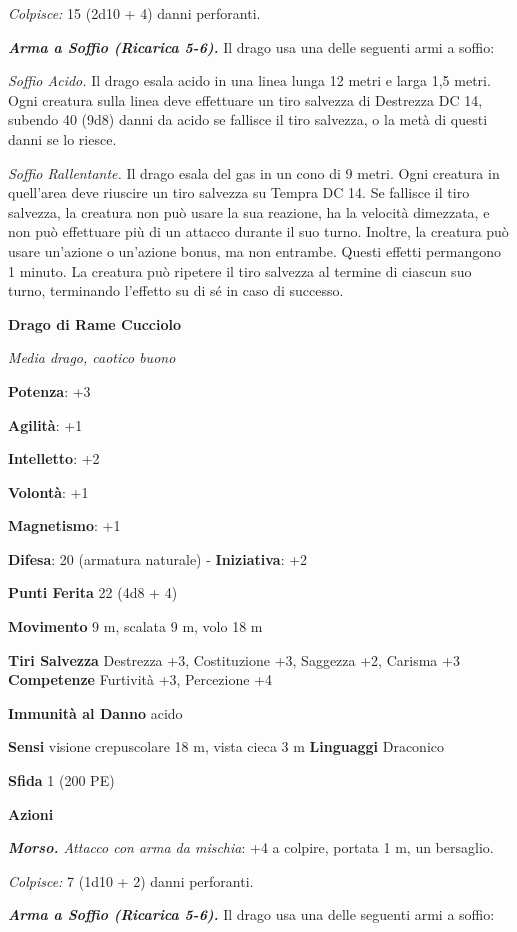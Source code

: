 \begin{multicols}{2}
\emph{Colpisce:} 15 (2d10 + 4) danni perforanti.

\emph{\textbf{Arma a Soffio (Ricarica 5-6).}} Il drago usa una delle
seguenti armi a soffio:

\emph{Soffio Acido.} Il drago esala acido in una linea lunga 12 metri e
larga 1,5 metri. Ogni creatura sulla linea deve effettuare un tiro
salvezza di Destrezza DC 14, subendo 40 (9d8) danni da acido se fallisce
il tiro salvezza, o la metà di questi danni se lo riesce.

\emph{Soffio Rallentante.} Il drago esala del gas in un cono di 9 metri.
Ogni creatura in quell'area deve riuscire un tiro salvezza su Tempra DC 14. Se fallisce il tiro salvezza, la creatura non può
usare la sua reazione, ha la velocità dimezzata, e non può effettuare
più di un attacco durante il suo turno. Inoltre, la creatura può usare
un'azione o un'azione bonus, ma non entrambe. Questi effetti permangono
1 minuto. La creatura può ripetere il tiro salvezza al termine di
ciascun suo turno, terminando l'effetto su di sé in caso di successo.

\textbf{Drago di Rame Cucciolo}

\emph{Media drago, caotico buono}

\textbf{Potenza}: +3

\textbf{Agilità}: +1

\textbf{Intelletto}: +2

\textbf{Volontà}: +1

\textbf{Magnetismo}: +1

\textbf{Difesa}: 20 (armatura naturale) - \textbf{Iniziativa}: +2

\textbf{Punti Ferita} 22 (4d8 + 4)

\textbf{Movimento} 9 m, scalata 9 m, volo 18 m

\textbf{Tiri Salvezza} Destrezza +3, Costituzione +3, Saggezza +2,
Carisma +3 \textbf{Competenze} Furtività +3, Percezione +4

\textbf{Immunità al Danno} acido

\textbf{Sensi} visione crepuscolare 18 m, vista cieca 3 m
\textbf{Linguaggi} Draconico

\textbf{Sfida} 1 (200 PE)\smallskip

\smallskip\textbf{Azioni}

\emph{\textbf{Morso.} Attacco con arma da mischia}: +4 a colpire,
portata 1 m, un bersaglio.

\emph{Colpisce:} 7 (1d10 + 2) danni perforanti.

\emph{\textbf{Arma a Soffio (Ricarica 5-6).}} Il drago usa una delle
seguenti armi a soffio:


\end{multicols}
